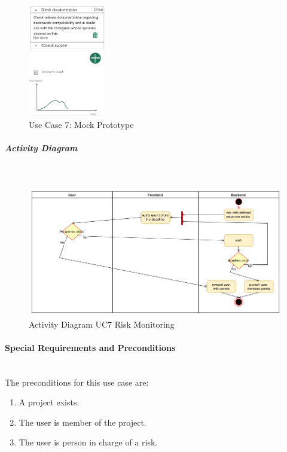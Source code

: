 \begin{figure}[H]
	\centering
	\includegraphics[width=0.3\textwidth]{Assets/UC_Screenshots/UC7S.png}
	\caption{Use Case 7: Mock Prototype}
	\label{fig:useCase7Detail}
\end{figure}
\newpage
\subparagraph{Activity Diagram}\mbox{}\\
\begin{figure}[H]
	\centering
	\includegraphics[width=1.0\textwidth]{Content/Domain/UC7RiskMonitoring.png}
	\caption{Activity Diagram \ac{UC}7 Risk Monitoring}
	\label{fig:label77}
\end{figure}

\paragraph*{Special Requirements and Preconditions}\mbox{}\\
The preconditions for this use case are:
\begin{enumerate}
	\vspace{-3mm}
	\setlength\itemsep{-1em}
	
	\item A project exists.
	\item The user is member of the project.
	\item The user is person in charge of a risk.
\end{enumerate}

